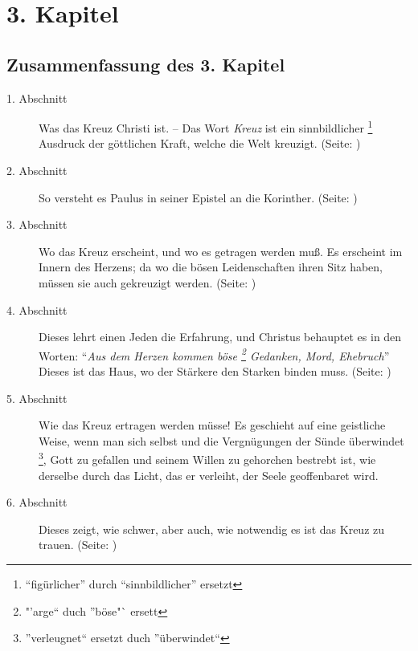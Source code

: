 

\chapter{3. Kapitel} \label{kap3}

\section{Zusammenfassung des 3. Kapitel}

\footnotesize
\begin{description}
\item[1. Abschnitt] Was das Kreuz Christi ist. -- Das Wort \textit{Kreuz} ist ein
sinnbildlicher \footnote{"`figürlicher"' durch "`sinnbildlicher"' ersetzt} 
Ausdruck der göttlichen Kraft, welche die Welt kreuzigt.
(Seite: \pageref{kap3_ab1})
\item[2. Abschnitt] So versteht es Paulus in seiner Epistel an die
Korinther. (Seite: \pageref{kap3_ab2})
\item[3. Abschnitt] Wo das Kreuz erscheint, und wo es getragen werden muß. Es
erscheint im Innern des Herzens; da wo die bösen Leidenschaften ihren Sitz haben,
müssen sie auch gekreuzigt werden. (Seite: \pageref{kap3_ab3})
\item[4. Abschnitt] Dieses lehrt einen Jeden %
die Erfahrung, und Christus
behauptet es in den Worten: "`\textit{Aus dem Herzen kommen böse \footnote{
"'arge"` duch "'böse"` ersett} Gedanken, Mord,
Ehebruch}"' Dieses ist das Haus, wo der Stärkere den Starken binden muss.
(Seite: \pageref{kap3_ab4})
\item[5. Abschnitt] Wie das Kreuz ertragen werden müsse! Es geschieht auf eine
geistliche Weise, wenn man sich selbst und die Vergnügungen der Sünde überwindet
\footnote{''verleugnet`` ersetzt duch ''überwindet``}, Gott zu gefallen und 
seinem Willen zu gehorchen bestrebt ist, wie
derselbe durch das Licht, das er verleiht, der Seele geoffenbaret wird.
\item[6. Abschnitt] Dieses zeigt, wie schwer, aber auch, wie notwendig es ist
das Kreuz zu trauen. (Seite: \pageref{kap3_ab5})
\end{description}
\normalsize

